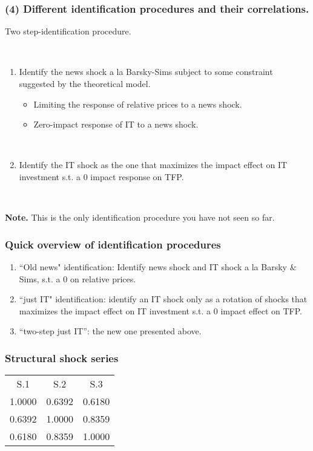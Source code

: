 \documentclass{beamer}
\begin{document}
\begin{frame}
\frametitle{(4) Different identification procedures and their correlations.}

Two step-identification procedure.

\


\begin{enumerate}
\item Identify the news shock a la Barsky-Sims subject to some constraint suggested by the theoretical model.


\begin{itemize}
	\item Limiting the response of relative prices to a news shock.
	\item Zero-impact response of IT to a news shock.
\end{itemize}

\


\item Identify the IT shock as the one that maximizes the impact effect on IT investment s.t. a 0 impact response on TFP.
\end{enumerate}

\


\textbf{Note.} This is the only identification procedure you have not seen so far. 




\end{frame}


\begin{frame}
\frametitle{Quick overview of identification procedures}
	\begin{enumerate}
		\item ``Old news" identification: Identify news shock and IT shock a la Barsky \& Sims, s.t. a 0 on relative prices.
		\item ``just IT" identification: identify an IT shock only as a rotation of shocks that maximizes the impact effect on IT investment s.t. a 0 impact effect on TFP.
		\item ``two-step just IT'': the new one presented above. 
	\end{enumerate}
\end{frame}




\begin{frame}
\frametitle{Structural shock series}
\begin{center}
\begin{tabular}{ccc}
	S.1 & S.2 & S.3 \\
	1.0000   & 0.6392 &   0.6180 \\
	0.6392  &  1.0000 &   0.8359 \\
	0.6180  &  0.8359 &   1.0000 \\
\end{tabular}
\end{center}



\end{frame}
\end{document}
